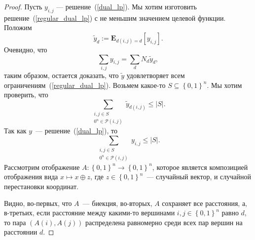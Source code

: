 \documentclass[12pt]{article}
\newcommand{\set}[1]{\left\{#1\right\}}
\newcommand{\abs}[1]{\left|#1\right|}
\newcommand{\zo}{\set{0, 1}}
\newcommand{\Pc}{\mathcal{P}}
\newcommand{\Exp}[2]{\mathbf{E}_{#1}\left[#2\right]}
\begin{document}
    \begin{proof}
        Пусть $y_{i,j}$ --- решение~(\ref{dual_lp}). Мы хотим изготовить решение~(\ref{regular_dual_lp}) с не меньшим значением целевой функции.
        Положим
        $$
            \tilde{y}_d := \Exp{d(i, j) = d}{y_{i,j}}.
        $$
        Очевидно, что
        $$
            \sum_{i,j}y_{i,j} = \sum_d N_d \tilde{y}_d,
        $$
        таким образом, остается доказать, что $\tilde{y}$ удовлетворяет
        всем ограничениям~(\ref{regular_dual_lp}).
        Возьмем какое-то $S \subseteq \zo^n$. Мы хотим проверить, что
        \begin{equation}
            \label{regular_constraint}
            \sum_{\begin{smallmatrix}i, j \in S \\ 0^n \in \Pc(i, j)\end{smallmatrix}}
            \tilde{y}_{d(i, j)} \leq \abs{S}.
        \end{equation}
        Так как $y$~--- решение~(\ref{dual_lp}), то 
        $$
            \sum_{\begin{smallmatrix}i, j \in S \\ 0^n \in \Pc(i, j)\end{smallmatrix}}
            y_{i, j} \leq \abs{S}.
        $$
        Рассмотрим отображение $A \colon \zo^n \to \zo^n$, которое является композицией отображения вида $x \mapsto x \oplus z$, где $z \in \zo^n$~--- случайный вектор,
        и случайной перестановки координат.

        Видно, во-первых, что $A$~--- биекция, во-вторых, $A$ сохраняет
        все расстояния,
        а, в-третьих, если расстояние между какими-то вершинами $i, j \in \zo^n$
        равно $d$, то пара $(A(i), A(j))$ распределена равномерно среди всех пар
        вершин на расстоянии $d$.


\end{proof}
\end{document}
